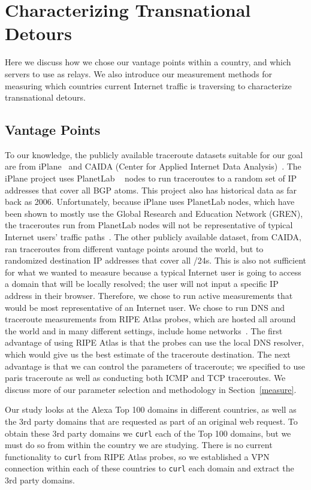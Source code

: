 \section{Characterizing Transnational Detours}
\label{datasets}
Here we discuss how we chose our vantage points within a country, and which servers to use as relays.  We also introduce our measurement methods for measuring which countries current Internet traffic is traversing to characterize transnational detours.

\subsection{Vantage Points}
To our knowledge, the publicly available traceroute datasets suitable for our goal are from iPlane~\cite{madhyastha2006iplane} and CAIDA (Center for Applied Internet Data Analysis)~\cite{caida}.  The iPlane project uses PlanetLab ~\cite{planetlab} nodes to run traceroutes to a random set of IP addresses that cover all BGP atoms.  This project also has historical data as far back as 2006.  Unfortunately, because iPlane uses PlanetLab nodes, which have been shown to mostly use the Global Research and Education Network (GREN), the traceroutes run from PlanetLab nodes will not be representative of typical Internet users' traffic paths~\cite{banerjee2004interdomain}.  The other publicly available dataset, from CAIDA, ran traceroutes from different vantage points around the world, but to randomized destination IP addresses that cover all /24s.  This is also not sufficient for what we wanted to measure because a typical Internet user is going to access a domain that will be locally resolved; the user will not input a specific IP address in their browser.  Therefore, we chose to run active measurements that would be most representative of an Internet user.  We chose to run DNS and traceroute measurements from RIPE Atlas probes, which are hosted all around the world and in many different settings, include home networks~\cite{ripe_atlas}.  The first advantage of using RIPE Atlas is that the probes can use the local DNS resolver, which would give us the best estimate of the traceroute destination.  The next advantage is that we can control the parameters of traceroute; we specified to use paris traceroute as well as conducting both ICMP and TCP traceroutes.  We discuss more of our parameter selection and methodology in Section~\ref{measure}.

Our study looks at the Alexa Top 100 domains in different countries, as well as the 3rd party domains that are requested as part of an original web request.  To obtain these 3rd party domains we {\tt curl} each of the Top 100 domains, but we must do so from within the country we are studying.  There is no current functionality to {\tt curl} from RIPE Atlas probes, so we established a VPN connection within each of these countries to {\tt curl} each domain and extract the 3rd party domains.

